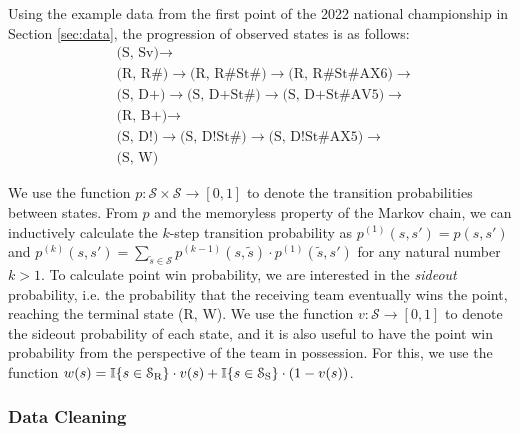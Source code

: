 \documentclass[USenglish]{article}
\theoremstyle{dgthm}
\theoremstyle{dgdef}
\begin{document}
Using the example data from the first point of the 2022 national championship in Section \ref{sec:data}, the progression of observed states is as follows:
\begin{align*}
    &\mbox{(S, Sv)}  \rightarrow\\
    &\mbox{(R, R\#)} \rightarrow \mbox{(R, R\#St\#)} \rightarrow \mbox{(R, R\#St\#AX6)} \rightarrow\\
    &\mbox{(S, D+)}  \rightarrow \mbox{(S, D+St\#)}  \rightarrow \mbox{(S, D+St\#AV5)}  \rightarrow\\
    &\mbox{(R, B+)}  \rightarrow\\
    &\mbox{(S, D!)}  \rightarrow \mbox{(S, D!St\#)}  \rightarrow \mbox{(S, D!St\#AX5)}  \rightarrow\\
    &\mbox{(S, W)}
\end{align*}

We use the function $p: \mathcal{S} \times \mathcal{S} \rightarrow [0, 1]$ to denote the transition probabilities between states. From $p$ and the memoryless property of the Markov chain, we can inductively calculate the $k$-step transition probability as $p^{(1)}(s, s') = p(s, s')$ and $p^{(k)}(s, s') = \sum_{\tilde s \in \mathcal{S}}p^{(k-1)}(s, \tilde s) \cdot p^{(1)}(\tilde s, s')$ for any natural number $k > 1$. To calculate point win probability, we are interested in the {\it sideout} probability, i.e. the probability that the receiving team eventually wins the point, reaching the terminal state (R, W). We use the function $v: \mathcal{S} \rightarrow [0, 1]$ to denote the sideout probability of each state, and it is also useful to have the point win probability from the perspective of the team in possession. For this, we use the function $w(s) = \mathbb{I}\{s \in \mathcal{S}_{\mbox{\scriptsize R}}\} \cdot v(s) + \mathbb{I}\{s \in \mathcal{S}_{\mbox{\scriptsize S}}\} \cdot (1 - v(s))$.

\subsubsection{Data Cleaning}
\label{sec:data-cleaning}
\end{document}
